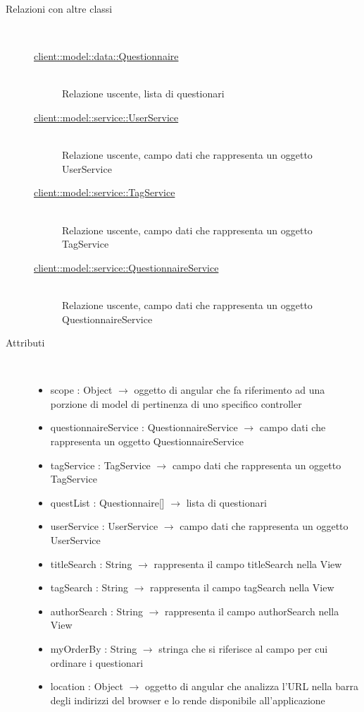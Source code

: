 \begin{description}
\item[Relazioni con altre classi] \hfill \\
\vspace{-7mm}
\begin{description}
	\item[\hyperlink{client::model::data::Questionnaire}{client::model::data::Questionnaire}] \hfill \\
	Relazione uscente, lista di questionari
	\item[\hyperlink{client::model::service::UserService}{client::model::service::UserService}] \hfill \\
	Relazione uscente, campo dati che rappresenta un oggetto UserService
	\item[\hyperlink{client::model::service::TagService}{client::model::service::TagService}] \hfill \\
	Relazione uscente, campo dati che rappresenta un oggetto TagService
	\item[\hyperlink{client::model::service::QuestionnaireService}{client::model::service::QuestionnaireService}] \hfill \\
	Relazione uscente, campo dati che rappresenta un oggetto QuestionnaireService
\end{description}

\item[Attributi] \hfill \\
\vspace{-7mm}
\begin{itemize}
	\item scope : Object $\rightarrow$ oggetto di angular che fa riferimento ad una porzione di model di pertinenza di uno specifico controller
	\item questionnaireService : QuestionnaireService $\rightarrow$ campo dati che rappresenta un oggetto QuestionnaireService
	\item tagService : TagService $\rightarrow$ campo dati che rappresenta un oggetto TagService
	\item questList : Questionnaire[] $\rightarrow$ lista di questionari
	\item userService : UserService $\rightarrow$ campo dati che rappresenta un oggetto UserService
	\item titleSearch : String $\rightarrow$ rappresenta il campo titleSearch nella View
	\item tagSearch : String $\rightarrow$ rappresenta il campo tagSearch nella View
	\item authorSearch : String $\rightarrow$ rappresenta il campo authorSearch nella View
	\item myOrderBy : String $\rightarrow$ stringa che si riferisce al campo per cui ordinare i questionari
	\item location : Object $\rightarrow$ oggetto di angular che analizza l'URL nella barra degli indirizzi del browser e lo rende disponibile all'applicazione
\end{itemize}


\end{description}

